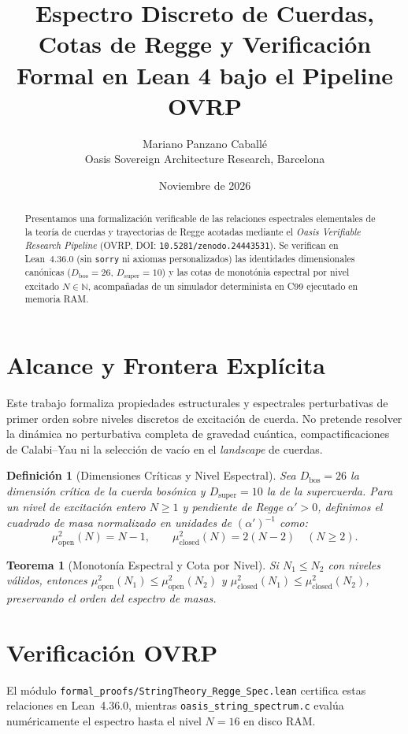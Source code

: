 \documentclass[11pt,a4paper]{article}
\title{Espectro Discreto de Cuerdas, Cotas de Regge y Verificaci\'on Formal en Lean 4 bajo el Pipeline OVRP}
\author{Mariano Panzano Caball\'e \\ \small Oasis Sovereign Architecture Research, Barcelona}
\date{Noviembre de 2026}
\newtheorem{definition}{Definici\'on}
\newtheorem{theorem}{Teorema}
\begin{document}
\maketitle

\begin{abstract}
Presentamos una formalizaci\'on verificable de las relaciones espectrales elementales de la teor\'ia de cuerdas y trayectorias de Regge acotadas mediante el \emph{Oasis Verifiable Research Pipeline} (OVRP, DOI: \texttt{10.5281/zenodo.24443531}). Se verifican en Lean~4.36.0 (sin \texttt{sorry} ni axiomas personalizados) las identidades dimensionales can\'onicas ($D_{\mathrm{bos}} = 26$, $D_{\mathrm{super}} = 10$) y las cotas de monot\'onia espectral por nivel excitado $N \in \mathbb{N}$, acompa\~nadas de un simulador determinista en C99 ejecutado en memoria RAM.
\end{abstract}

\section{Alcance y Frontera Expl\'icita}
Este trabajo formaliza propiedades estructurales y espectrales perturbativas de primer orden sobre niveles discretos de excitaci\'on de cuerda. No pretende resolver la din\'amica no perturbativa completa de gravedad cu\'antica, compactificaciones de Calabi--Yau ni la selecci\'on de vac\'io en el \emph{landscape} de cuerdas.

\begin{definition}[Dimensiones Cr\'iticas y Nivel Espectral]
Sea $D_{\mathrm{bos}} = 26$ la dimensi\'on cr\'itica de la cuerda bos\'onica y $D_{\mathrm{super}} = 10$ la de la supercuerda. Para un nivel de excitaci\'on entero $N \ge 1$ y pendiente de Regge $\alpha' > 0$, definimos el cuadrado de masa normalizado en unidades de $(\alpha')^{-1}$ como:
\[
\mu_{\mathrm{open}}^2(N) = N - 1, \qquad \mu_{\mathrm{closed}}^2(N) = 2(N - 2) \quad (N \ge 2).
\]
\end{definition}

\begin{theorem}[Monoton\'ia Espectral y Cota por Nivel]
Si $N_1 \le N_2$ con niveles v\'alidos, entonces $\mu_{\mathrm{open}}^2(N_1) \le \mu_{\mathrm{open}}^2(N_2)$ y $\mu_{\mathrm{closed}}^2(N_1) \le \mu_{\mathrm{closed}}^2(N_2)$, preservando el orden del espectro de masas.
\end{theorem}

\section{Verificaci\'on OVRP}
El m\'odulo \texttt{formal\_proofs/StringTheory\_Regge\_Spec.lean} certifica estas relaciones en Lean~4.36.0, mientras \texttt{oasis\_string\_spectrum.c} eval\'ua num\'ericamente el espectro hasta el nivel $N = 16$ en disco RAM.
\end{document}
